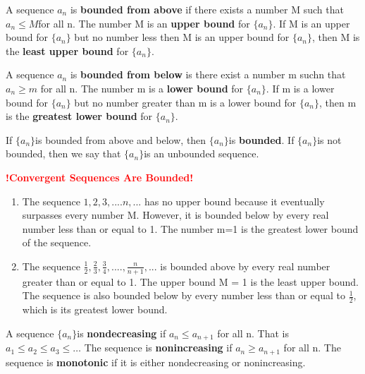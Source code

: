 \documentclass[12pt,a4paper]{article}
\newenvironment{definition}{\begin{definitionbox}}{\end{definitionbox}\vspace{1\baselineskip}}
\newcommand{\anc}{\(\{a_n\}\)}
\begin{document}
\begin{definition}
    A sequence $a_n$ is \textbf{bounded from above } if there exists a number M such that $a_n \leq M$for all n. The number M is an \textbf{upper bound} for $\{a_n\}$. If M is an upper bound for \(\{a_n\}\) but no number less then M is an upper bound for \(\{a_n\}\), then M is the \textbf{least upper bound} for \(\{a_n\}\).

    A sequence $a_n$ is \textbf{bounded from below} is there exist a number m suchn that $ a_n \geq m $ for  all n. The number m is a \textbf{lower bound} for $\{a_n\}$. If m is a lower bound for \(\{a_n\}\) but no number greater than m is a lower bound for \(\{a_n\}\), then m is the \textbf{greatest lower bound} for \anc. 

    If \anc is bounded from above and below, then \anc is \textbf{bounded}. If \anc is not bounded, then we say that \anc is an unbounded sequence. 

\end{definition}

\begin{center}
    \textcolor{red}{\textbf{!Convergent Sequences Are Bounded!}}
\end{center}


\begin{example}
    \begin{enumerate}[label=\textbf{\alph*)}]
        \item The sequence $1, 2, 3, .... n, ...$ has no upper bound because it eventually  surpasses every number M. However, it is bounded below by every real number less than or equal to 1. The number m=1 is the greatest lower bound of the sequence.
        \item The sequence $\frac{1}{2}, \frac{2}{3}, \frac{3}{4}, .... , \frac{n}{n+1}, ...$ is bounded above by every real number greater than or equal to 1. The upper bound M = 1 is the least upper bound. The sequence is also bounded below by every number less than or equal to $\frac{1}{2}$, which is its greatest lower bound.  
    \end{enumerate}
\end{example}

\newpage

\begin{definition}
    
    A sequence \anc is \textbf{nondecreasing} if \( a_n \leq a_{n+1}\) for all n. That is \( a_1 \leq a_2 \leq a_3 \leq \dots \)
    The sequence is \textbf{nonincreasing} if \(a_n \geq a_{n+1}\) for all n.
    The sequence is \textbf{monotonic} if it is either nondecreasing or nonincreasing.

\end{definition}
\end{document}

